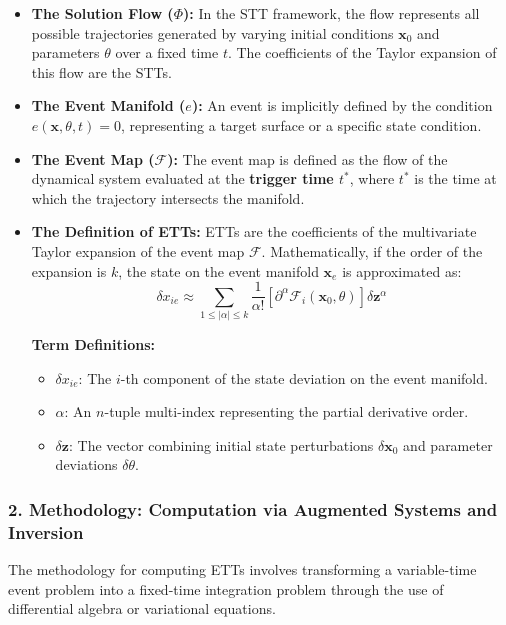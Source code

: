 \documentclass[
  letterpaper,
  DIV=11,
  numbers=noendperiod,
  oneside]{scrartcl}
\begin{document}
\begin{itemize}
\item
  \textbf{The Solution Flow (\(\Phi\)):} In the STT framework, the flow
  represents all possible trajectories generated by varying initial
  conditions \(\mathbf{x}_0\) and parameters \(\theta\) over a fixed
  time \(t\). The coefficients of the Taylor expansion of this flow are
  the STTs.
\item
  \textbf{The Event Manifold (\(e\)):} An event is implicitly defined by
  the condition \(e(\mathbf{x}, \theta, t) = 0\), representing a target
  surface or a specific state condition.
\item
  \textbf{The Event Map (\(\mathcal{F}\)):} The event map is defined as
  the flow of the dynamical system evaluated at the \textbf{trigger time
  \(t^*\)}, where \(t^*\) is the time at which the trajectory intersects
  the manifold.
\item
  \textbf{The Definition of ETTs:} ETTs are the coefficients of the
  multivariate Taylor expansion of the event map \(\mathcal{F}\).
  Mathematically, if the order of the expansion is \(k\), the state on
  the event manifold \(\mathbf{x}_e\) is approximated as: \[
  \delta x_{ie} \approx \sum_{1 \le |\alpha| \le k} \frac{1}{\alpha!} \left[ \partial^\alpha \mathcal{F}_i(\mathbf{x}_0, \theta) \right] \delta \mathbf{z}^\alpha
  \]

  \textbf{Term Definitions:}

  \begin{itemize}
  \item
    \(\delta x_{ie}\): The \(i\)-th component of the state deviation on
    the event manifold.
  \item
    \(\alpha\): An \(n\)-tuple multi-index representing the partial
    derivative order.
  \item
    \(\delta \mathbf{z}\): The vector combining initial state
    perturbations \(\delta \mathbf{x}_0\) and parameter deviations
    \(\delta \theta\).
  \end{itemize}
\end{itemize}

\subsubsection{2. Methodology: Computation via Augmented Systems and
Inversion}\label{methodology-computation-via-augmented-systems-and-inversion}

The methodology for computing ETTs involves transforming a variable-time
event problem into a fixed-time integration problem through the use of
differential algebra or variational equations.
\end{document}
